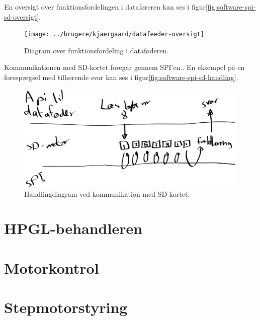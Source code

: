 En oversigt over funktionsfordelingen i
dataføreren kan ses i
figur\vref{fig:software-spi-sd-oversigt}.

\begin{figure}[htbp]
  \centering
  \texttt{[image: ../brugere/kjaergaard/datafeeder-oversigt]}
  \caption{Diagram over funktionsfordeling i dataføderen.}
  \label{fig:software-spi-sd-oversigt}
\end{figure}

Kommunikationen med SD-kortet foregår gennem SPI'en.. En eksempel på en forespørgsel med tilhørende svar
kan ses i figur\vref{fig:software-spi-sd-handling}.

\begin{figure}[htbp]
  \centering
  \includegraphics[width=\textwidth]{../brugere/kjaergaard/datafeeder-handling}
  \caption{Handlingdiagram ved kommunikation med SD-kortet.}
  \label{fig:software-spi-sd-handling}
\end{figure}


\section{HPGL-behandleren}



\section[Motorkontrol (med buffer)]{Motorkontrol}



\section{Stepmotorstyring}

